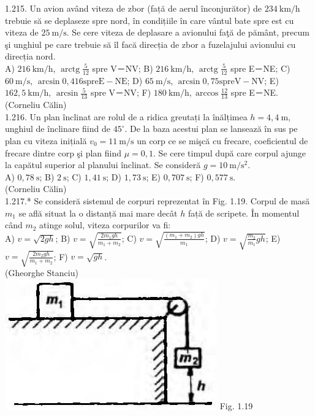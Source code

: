 1.215. Un avion având viteza de zbor (față de aerul înconjurător) de $234 \mathrm{~km} / \mathrm{h}$ trebuie să se deplaseze spre nord, în condițiile în care vântul bate spre est cu viteza de $25 \mathrm{~m} / \mathrm{s}$. Se cere viteza de deplasare a avionului faţă de pământ, precum şi unghiul pe care trebuie să îl facă direcția de zbor a fuzelajului avionului cu direcția nord.\\ A) $216 \mathrm{~km} / \mathrm{h}$, $\operatorname{arctg} \frac{5}{12}$ spre V－NV; B) $216 \mathrm{~km} / \mathrm{h}$, $\operatorname{arctg} \frac{5}{12}$ spre E－NE; C) $60 \mathrm{~m} / \mathrm{s}$, $\arcsin 0,416 \mathrm{spre} \mathrm{E}-\mathrm{NE}$; D) $65 \mathrm{~m} / \mathrm{s}$, $\arcsin 0,75 \mathrm{spre} \mathrm{V}-\mathrm{NV}$; E) $162,5 \mathrm{~km} / \mathrm{h}$, $\arcsin \frac{5}{13}$ spre V－NV; F) $180 \mathrm{~km} / \mathrm{h}, \arccos \frac{12}{13}$ spre E－NE.\\ (Corneliu Călin)\\

1.216. Un plan înclinat are rolul de a ridica greutați la înălțimea $h=4,4 \mathrm{~m}$, unghiul de înclinare fiind de $45^{\circ}$. De la baza acestui plan se lansează în sus pe plan cu viteza inițială $v_{0}=11 \mathrm{~m} / \mathrm{s}$ un corp ce se mişcă cu frecare, coeficientul de frecare dintre corp şi plan fiind $\mu=0,1$. Se cere timpul după care corpul ajunge la capătul superior al planului înclinat. Se consideră $g=10 \mathrm{~m} / \mathrm{s}^{2}$.\\ A) $0,78 \mathrm{~s}$; B) $2 \mathrm{~s}$; C) $1,41 \mathrm{~s}$; D) $1,73 \mathrm{~s}$; E) $0,707 \mathrm{~s}$; F) $0,577 \mathrm{~s}$.\\ (Corneliu Călin)\\

1.217.* Se consideră sistemul de corpuri reprezentat în Fig. 1.19. Corpul de masă $m_{1}$ se află situat la o distanță mai mare decât $h$ față de scripete. În momentul când $m_{2}$ atinge solul, viteza corpurilor va fi:\\ A) $v=\sqrt{2 g h}$; B) $v=\sqrt{\frac{2 m_{1} g h}{m_{1}+m_{2}}}$; C) $v=\sqrt{\frac{\left(m_{1}+m_{2}\right) g h}{m_{1}}}$; D) $v=\sqrt{\frac{m_{2}}{m_{1}} g h}$; E) $v=\sqrt{\frac{2 m_{2} g h}{m_{1}+m_{2}}}$; F) $v=\sqrt{g h}$.\\ (Gheorghe Stanciu)\\ \includegraphics[width=0.4\linewidth]{images/2025_07_01_5b3ff9fa0d508c8e9f17g-050} Fig. 1.19\\

